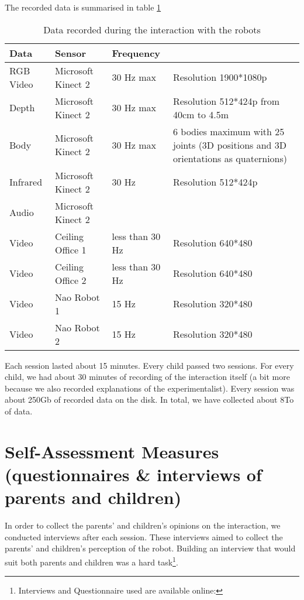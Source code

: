 \documentclass[a4paper,twocolumn]{svjour3}
\begin{document}
The recorded data is summarised in table \ref{tab:dataset}
\begin{table}[h]
	\centering
	\caption{Data recorded during the interaction with the robots}
	\begin{tabular}{l l p{2cm} p{3.5cm}}
		\hline
		Data  & Sensor & Frequency & \\ \hline
		RGB Video & Microsoft Kinect 2 & 30 Hz max & Resolution 1900*1080p \\
		Depth & Microsoft Kinect 2 & 30 Hz max & Resolution 512*424p from 40cm to 4.5m \\
		Body & Microsoft Kinect 2 & 30 Hz max & 6 bodies maximum with 25 joints (3D positions and 3D orientations as quaternions)\\
		Infrared & Microsoft Kinect 2 & 30 Hz & Resolution 512*424p \\ 
		Audio & Microsoft Kinect 2 &  &  \\
		\hline
		Video & Ceiling Office 1 & less than 30 Hz & Resolution 640*480 \\
		Video & Ceiling Office 2 & less than 30 Hz & Resolution 640*480 \\
		\hline
		Video & Nao Robot 1 & 15 Hz & Resolution 320*480 \\
		Video & Nao Robot 2 & 15 Hz & Resolution 320*480 \\
		\hline
	\end{tabular}
	\label{tab:dataset}
\end{table}


Each session lasted about 15 minutes. 
Every child passed two sessions. 
For every child, we had about 30 minutes of recording of the interaction itself (a bit more because we also recorded explanations of the experimentalist). 
Every session was about 250Gb of recorded data on the disk. 
In total, we have collected about 8To of data. 






\section{Self-Assessment Measures (questionnaires \& interviews of parents and children)}
In order to collect the parents' and children's opinions on the interaction, we conducted interviews after each session.
These interviews aimed to collect the parents' and children's perception of the robot.
Building an interview that would suit both parents and children was a hard task\footnote{Interviews and Questionnaire used are available online: }.%
\end{document}

